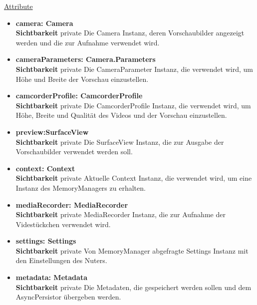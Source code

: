 \underline{Attribute}
\begin{itemize}
\itemsep0pt
\item \textbf{camera: Camera} \hfill\\ 
\textbf{Sichtbarkeit} private \newline
Die Camera Instanz, deren Vorschaubilder angezeigt werden und die zur Aufnahme verwendet wird.

\item \textbf{cameraParameters: Camera.Parameters} \hfill\\ 
\textbf{Sichtbarkeit} private \newline
Die CameraParameter Instanz, die verwendet wird, um Höhe und Breite der Vorschau einzustellen.

\item \textbf{camcorderProfile: CamcorderProfile} \hfill\\ 
\textbf{Sichtbarkeit} private \newline
Die CamcorderProfile Instanz, die verwendet wird, um Höhe, Breite und Qualität des Videos  und der Vorschau einzustellen.

\item \textbf{preview:SurfaceView} \hfill\\ 
\textbf{Sichtbarkeit} private \newline
Die SurfaceView Instanz, die zur Ausgabe der Vorschaubilder verwendet werden soll.

\item \textbf{context: Context} \hfill\\ 
\textbf{Sichtbarkeit} private \newline
Aktuelle Context Instanz, die verwendet wird, um eine Instanz des MemoryManagers zu erhalten.

\item \textbf{mediaRecorder: MediaRecorder} \hfill\\ 
\textbf{Sichtbarkeit} private \newline
MediaRecorder Instanz, die zur Aufnahme der Videstückchen verwendet wird.

\item \textbf{settings: Settings} \hfill\\ 
\textbf{Sichtbarkeit} private \newline
Von MemoryManager abgefragte Settings Instanz mit den Einstellungen des Nuters.

\item \textbf{metadata: Metadata} \hfill\\ 
\textbf{Sichtbarkeit} private \newline
Die Metadaten, die gespeichert werden sollen und dem AsyncPersistor übergeben werden.


\end{itemize}
